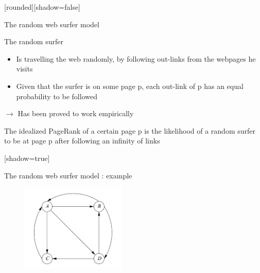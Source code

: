 \documentclass[10pt]{beamer}
\begin{document}
[rounded][shadow=false]
\begin{frame}[allowframebreaks]{The random web surfer model}
  \begin{block}{The random surfer}
    \begin{itemize}
      \item Is travelling the web randomly, by following out-links from the webpages he visits
      \item Given that the surfer is on some page p, each out-link of p has an equal probability to be followed
    \end{itemize}
    $\rightarrow$ Has been proved to work empirically
  \end{block}
  \begin{definition}
  The idealized PageRank of a certain page p is the likelihood of a random surfer to be at page p after following an infinity of links

  \end{definition}
\end{frame}

[shadow=true]
\begin{frame}{The random web surfer model : example}
      \begin{figure}
      \centering
        \includegraphics[width = 5cm]{graph1.png}
      \end{figure}
\end{frame}
\end{document}
